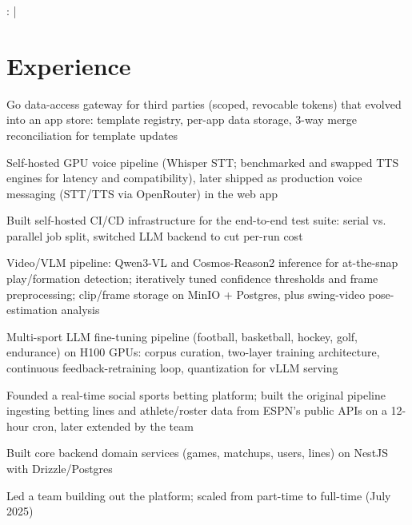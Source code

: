 \documentclass[]{jack-resume}
\begin{document}
\raggedright{
    :
      \href{https://www.linkedin.com/in/jack-sturtevant/}{ \ExternalLink} |
     \href{https://github.com/jacksturt}{ \ExternalLink}}


\section{Experience}

\begin{tightemize}
    \item Go data-access gateway for third parties (scoped, revocable tokens) that evolved into an app store: template registry, per-app data storage, 3-way merge reconciliation for template updates
    \item Self-hosted GPU voice pipeline (Whisper STT; benchmarked and swapped TTS engines for latency and compatibility), later shipped as production voice messaging (STT/TTS via OpenRouter) in the web app
    \item Built self-hosted CI/CD infrastructure for the end-to-end test suite: serial vs. parallel job split, switched LLM backend to cut per-run cost
    \item Video/VLM pipeline: Qwen3-VL and Cosmos-Reason2 inference for at-the-snap play/formation detection; iteratively tuned confidence thresholds and frame preprocessing; clip/frame storage on MinIO + Postgres, plus swing-video pose-estimation analysis
    \item Multi-sport LLM fine-tuning pipeline (football, basketball, hockey, golf, endurance) on H100 GPUs: corpus curation, two-layer training architecture, continuous feedback-retraining loop, quantization for vLLM serving
\end{tightemize}
\sectionsep

\begin{tightemize}
    \item Founded a real-time social sports betting platform; built the original pipeline ingesting betting lines and athlete/roster data from ESPN's public APIs on a 12-hour cron, later extended by the team
    \item Built core backend domain services (games, matchups, users, lines) on NestJS with Drizzle/Postgres
    \item Led a team building out the platform; scaled from part-time to full-time (July 2025)
\end{tightemize}
\sectionsep
\end{document}
